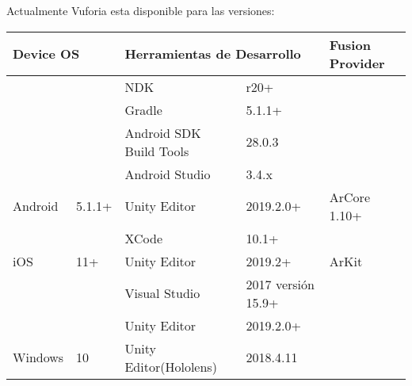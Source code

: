 Actualmente Vuforia esta disponible para las versiones:
\begin{table}[]
	\begin{tabular}{|l|l|l|l|l|l|}
		\hline
		\multicolumn{2}{|l|}{Device OS}                       & \multicolumn{2}{l|}{Herramientas de Desarrollo}                                             & \multicolumn{2}{l|}{Fusion Provider}                \\ \hline
		&                          & NDK                                            & r20+                                       &                                &                    \\ \cline{3-4}
		&                          & \cellcolor[HTML]{EFEFEF}Gradle                 & \cellcolor[HTML]{EFEFEF}5.1.1+             &                                &                    \\ \cline{3-4}
		&                          & Android SDK Build Tools                        & 28.0.3                                     &                                &                    \\ \cline{3-4}
		&                          & \cellcolor[HTML]{EFEFEF}Android Studio         & \cellcolor[HTML]{EFEFEF}3.4.x              &                                &                    \\ \cline{3-4}
		\multirow{-5}{*}{Android}  & \multirow{-5}{*}{5.1.1+} & Unity Editor                                   & 2019.2.0+                                  & \multirow{-5}{*}{ArCore 1.10+} & \multirow{-5}{*}{} \\ \hline
		&                          & \cellcolor[HTML]{EFEFEF}XCode                  & \cellcolor[HTML]{EFEFEF}10.1+              & \multicolumn{2}{l|}{}                               \\ \cline{3-4}
		\multirow{-2}{*}{iOS}      & \multirow{-2}{*}{11+}    & Unity Editor                                   & 2019.2+                                    & \multicolumn{2}{l|}{\multirow{-2}{*}{ArKit}}        \\ \hline
		&                          & \cellcolor[HTML]{EFEFEF}Visual Studio          & \cellcolor[HTML]{EFEFEF}2017 versión 15.9+ & \multicolumn{2}{l|}{}                               \\ \cline{3-4}
		&                          & Unity Editor                                   & 2019.2.0+                                  & \multicolumn{2}{l|}{}                               \\ \cline{3-4}
		\multirow{-3}{*}{Windows}  & \multirow{-3}{*}{10}     & \cellcolor[HTML]{EFEFEF}Unity Editor(Hololens) & \cellcolor[HTML]{EFEFEF}2018.4.11          & \multicolumn{2}{l|}{\multirow{-3}{*}{}}             \\ \hline

\end{tabular}
\end{table}
